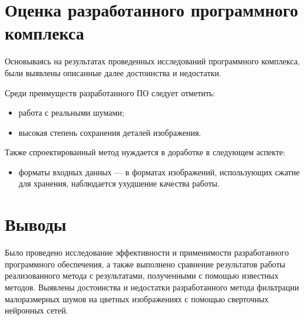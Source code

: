\section{Оценка разработанного программного комплекса}

Основываясь на результатах проведенных исследований программного комплекса, были выявлены описанные далее достоинства и недостатки.

Среди преимуществ разработанного ПО следует отметить:
\begin{itemize}
    \item работа с реальными шумами;
    \item высокая степень сохранения деталей изображения.
\end{itemize}

Также спроектированный метод нуждается в доработке в следующем аспекте:
\begin{itemize}
    \item форматы входных данных --- в форматах изображений, использующих сжатие для хранения, наблюдается ухудшение качества работы.
\end{itemize}

\newpage

\section{Выводы}

Было проведено исследование эффективности и применимости разработанного программного обеспечения, а также выполнено сравнение результатов работы реализованного метода с результатами, полученными с помощью известных методов. Выявлены достоинства и недостатки разработанного метода фильтрации малоразмерных шумов на цветных изображениях с помощью сверточных нейронных сетей.